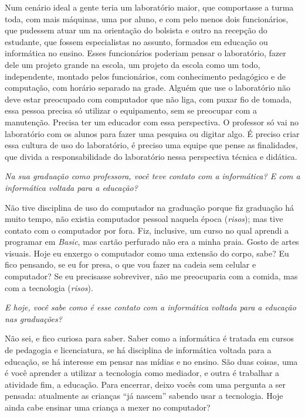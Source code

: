 Num cenário ideal a gente teria um laboratório maior, que comportasse a turma toda, com mais máquinas, uma por aluno, e com pelo menos dois funcionários, que pudessem atuar um na orientação do bolsista e outro na recepção do estudante, que fossem especialistas no assunto, formados em educação ou informática no ensino. Esses funcionários poderiam pensar o laboratório, fazer dele um projeto grande na escola, um projeto da escola como um todo, independente, montado pelos funcionários, com conhecimento pedagógico e de computação, com horário separado na grade. Alguém que use o laboratório não deve estar preocupado com computador que não liga, com puxar fio de tomada, essa pessoa precisa só utilizar o equipamento, sem se preocupar com a manutenção. Precisa ter um educador com essa perspectiva. O professor só vai no laboratório com os alunos para fazer uma pesquisa ou digitar algo. É preciso criar essa cultura de uso do laboratório, é preciso uma equipe que pense as finalidades, que divida a responsabilidade do laboratório nessa perspectiva técnica e didática.

\textit{Na sua graduação como professora, você teve contato com a informática? E com a informática voltada para a educação?}

Não tive disciplina de uso do computador na graduação porque fiz graduação há muito tempo, não existia computador pessoal naquela época (\textit{risos}); mas tive contato com o computador por fora. Fiz, inclusive, um curso no qual aprendi a programar em \textit{Basic}, mas cartão perfurado não era a minha praia. Gosto de artes visuais.
Hoje eu enxergo o computador como uma extensão do corpo, sabe? Eu fico pensando, se eu for presa, o que vou fazer na cadeia sem celular e computador? Se eu precisasse sobreviver, não me preocuparia com a comida, mas com a tecnologia (\textit{risos}).

\textit{E hoje, você sabe como é esse contato com a informática voltada para a educação nas graduações?}

Não sei, e fico curiosa para saber. Saber como a informática é tratada em cursos de pedagogia e licenciatura, se há disciplina de informática voltada para a educação, se há interesse em pensar nas mídias e no ensino. São duas coisas, uma é você aprender a utilizar a tecnologia como mediador, e outra é trabalhar a atividade fim, a educação. Para encerrar, deixo vocês com uma pergunta a ser pensada: atualmente as crianças “já nascem” sabendo usar a tecnologia. Hoje ainda cabe ensinar uma criança a mexer no computador?


